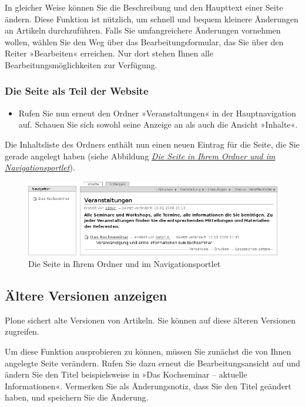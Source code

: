 \documentclass[a4paper,12pt,ngerman]{manual}
\begin{document}
In gleicher Weise können Sie die Beschreibung und den Haupttext einer Seite
ändern. Diese Funktion ist nützlich, um schnell und bequem kleinere Änderungen
an Artikeln durchzuführen. Falls Sie umfangreichere Änderungen vornehmen
wollen, wählen Sie den Weg über das Bearbeitungsformular, das Sie über den
Reiter »Bearbeiten« erreichen. Nur dort stehen Ihnen alle
Bearbeitungsmöglichkeiten zur Verfügung.


\subsubsection{Die Seite als Teil der Website}
\begin{itemize}
\item {} 
Rufen Sie nun erneut den Ordner »Veranstaltungen« in der Hauptnavigation
auf. Schauen Sie sich sowohl seine Anzeige an als auch die Ansicht
»Inhalte«.

\end{itemize}

Die Inhaltsliste des Ordners enthält nun einen neuen Eintrag für die Seite,
die Sie gerade angelegt haben (siehe Abbildung \hyperlink{fig-homefolder-page}{\emph{Die Seite in Ihrem Ordner und im Navigationsportlet}}).
\hypertarget{fig-homefolder-page}{}\begin{figure}[htbp]
\centering

\includegraphics{homefolder+page.png}
\caption{Die Seite in Ihrem Ordner und im Navigationsportlet}\end{figure}


\subsection{Ältere Versionen anzeigen}

Plone sichert alte Versionen von Artikeln. Sie können auf diese älteren
Versionen zugreifen.

Um diese Funktion ausprobieren zu können, müssen Sie zunächst die von Ihnen
angelegte Seite verändern. Rufen Sie dazu erneut die Bearbeitungsansicht auf
und ändern Sie den Titel beispielsweise in »Das Kochseminar -- aktuelle
Informationen«. Vermerken Sie als Änderungsnotiz, dass Sie den Titel geändert
haben, und speichern Sie die Änderung.
\end{document}
